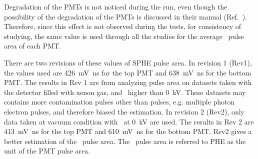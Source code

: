 Degradation of the PMTs is not noticed during the run, even though the possibility of the degradation of the PMTs is discussed in their manual (Ref.~\cite{HamamatsuPhotonics2006}). Therefore, since this effect is not observed during the tests, for consistency of studying, the same value is used through all the studies for the average \sphe\ pulse area of each PMT. 

There are two revisions of these values of SPHE pulse area. In revision 1 (Rev1), the values used are \SI{426}{\mV\ns} for the top PMT and \SI{638}{\mV\ns} for the bottom PMT. The results in Rev 1 are from analyzing pulse area on datasets taken with the detector filled with xenon gas, and \opvtvb\ higher than \SI{0}{\kV}. These datasets may contains more contamination pulses other than \sphe pulses, e.g. multiple photon electron pulses, and therefore biased the estimation. In revision 2 (Rev2), only data taken at vacuum condition with \opvtvb\ at \SI{0}{\kV} are used. The results in Rev 2 are \SI{413}{\mV\ns} for the top PMT and \SI{610}{\mV\ns} for the bottom PMT. Rev2 gives a better estimation of the \sphe\ pulse area. The \sphe\ pulse area is referred to PHE as the unit of the PMT pulse area.

